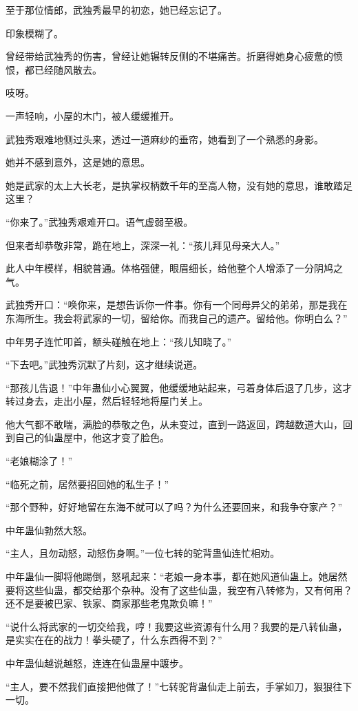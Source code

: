 \begin{this_body}
至于那位情郎，武独秀最早的初恋，她已经忘记了。

印象模糊了。

曾经带给武独秀的伤害，曾经让她辗转反侧的不堪痛苦。折磨得她身心疲惫的愤恨，都已经随风散去。

吱呀。

一声轻响，小屋的木门，被人缓缓推开。

武独秀艰难地侧过头来，透过一道麻纱的垂帘，她看到了一个熟悉的身影。

她并不感到意外，这是她的意思。

她是武家的太上大长老，是执掌权柄数千年的至高人物，没有她的意思，谁敢踏足这里？

“你来了。”武独秀艰难开口。语气虚弱至极。

但来者却恭敬非常，跪在地上，深深一礼：“孩儿拜见母亲大人。”

此人中年模样，相貌普通。体格强健，眼眉细长，给他整个人增添了一分阴鸠之气。

武独秀开口：“唤你来，是想告诉你一件事。你有一个同母异父的弟弟，那是我在东海所生。我会将武家的一切，留给你。而我自己的遗产。留给他。你明白么？”

中年男子连忙叩首，额头碰触在地上：“孩儿知晓了。”

“下去吧。”武独秀沉默了片刻，这才继续说道。

“那孩儿告退！”中年蛊仙小心翼翼，他缓缓地站起来，弓着身体后退了几步，这才转过身去，走出小屋，然后轻轻地将屋门关上。

他大气都不敢喘，满脸的恭敬之色，从未变过，直到一路返回，跨越数道大山，回到自己的仙蛊屋中，他这才变了脸色。

“老娘糊涂了！”

“临死之前，居然要招回她的私生子！”

“那个野种，好好地留在东海不就可以了吗？为什么还要回来，和我争夺家产？”

中年蛊仙勃然大怒。

“主人，且勿动怒，动怒伤身啊。”一位七转的驼背蛊仙连忙相劝。

中年蛊仙一脚将他踢倒，怒吼起来：“老娘一身本事，都在她风道仙蛊上。她居然要将这些仙蛊，都交给那个杂种。没有了这些仙蛊，我空有八转修为，又有何用？还不是要被巴家、铁家、商家那些老鬼欺负嘛！”

“说什么将武家的一切交给我，哼！我要这些资源有什么用？我要的是八转仙蛊，是实实在在的战力！拳头硬了，什么东西得不到？”

中年蛊仙越说越怒，连连在仙蛊屋中踱步。

“主人，要不然我们直接把他做了！”七转驼背蛊仙走上前去，手掌如刀，狠狠往下一切。


\end{this_body}
